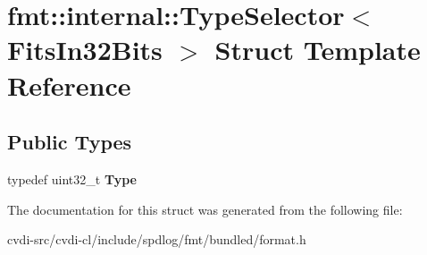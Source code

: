 \hypertarget{structfmt_1_1internal_1_1TypeSelector}{}\section{fmt\+:\+:internal\+:\+:Type\+Selector$<$ Fits\+In32\+Bits $>$ Struct Template Reference}
\label{structfmt_1_1internal_1_1TypeSelector}
\subsection*{Public Types}
\begin{DoxyCompactItemize}
\item 
typedef uint32\+\_\+t {\bfseries Type}\hypertarget{structfmt_1_1internal_1_1TypeSelector_aa2a4ce5a506b026fa2eadce9c14b8841}{}\label{structfmt_1_1internal_1_1TypeSelector_aa2a4ce5a506b026fa2eadce9c14b8841}

\end{DoxyCompactItemize}


The documentation for this struct was generated from the following file\+:\begin{DoxyCompactItemize}
\item 
cvdi-\/src/cvdi-\/cl/include/spdlog/fmt/bundled/format.\+h\end{DoxyCompactItemize}
